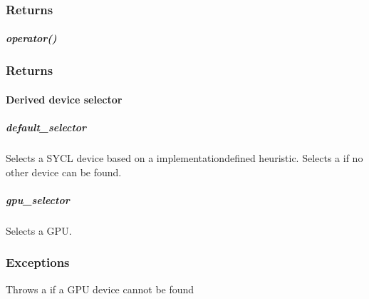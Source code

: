 \documentclass[letterpaper,10pt,english]{sphinxmanual}
\begin{document}
\subsubsection*{Returns}


\subparagraph{operator()}
\label{\detokenize{programming-interface/runtime/device-selector:operator}}
\begin{sphinxVerbatim}[commandchars=\\\{\}]
       
\end{sphinxVerbatim}
\subsubsection*{Returns}


\paragraph{Derived device selector}
\label{\detokenize{programming-interface/runtime/device-selector:derived-device-selector}}

\subparagraph{default\_selector}
\label{\detokenize{programming-interface/runtime/device-selector:default-selector}}
\begin{sphinxVerbatim}[commandchars=\\\{\}]
 
\end{sphinxVerbatim}

Selects a SYCL device based on a implementation\sphinxhyphen{}defined
heuristic. Selects a {\hyperref[\detokenize{glossary:term-host-device}]{}} if no other device can be
found.


\subparagraph{gpu\_selector}
\label{\detokenize{programming-interface/runtime/device-selector:gpu-selector}}
\begin{sphinxVerbatim}[commandchars=\\\{\}]
 
\end{sphinxVerbatim}

Selects a GPU.
\subsubsection*{Exceptions}

Throws a  if a GPU device cannot be found
\end{document}
